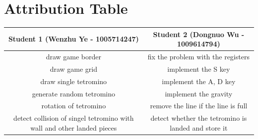 \documentclass{article}
\begin{document}
\section{Attribution Table}

\begin{center}
\begin{tabular}{|| c | c ||}
\hline
 Student 1 (Wenzhu Ye - 1005714247) &  Student 2 (Dongnuo Wu - 1009614794) \\ 
 \hline
 draw game border & fix the problem with the registers\\
 \hline
 draw game grid & implement the S key\\
 \hline
 draw single tetromino & implement the A, D key\\ 
 \hline
 generate random tetromino & implement the gravity\\ 
 \hline
 rotation of tetromino & remove the line if the line is full\\
 \hline
 detect collision of singel tetromino with wall and other landed pieces & detect whether the tetromino is landed and store it \\  
 \hline
\end{tabular}
\end{center}

\end{document}
